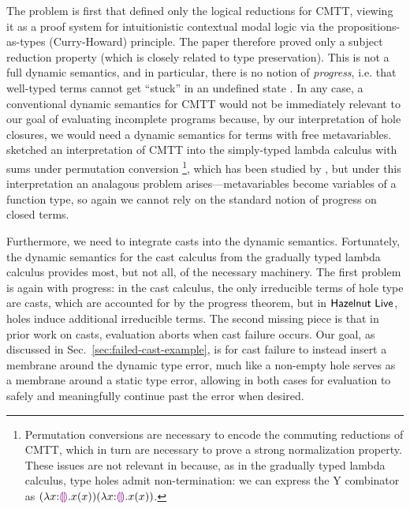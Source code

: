 The problem is first that \citet{Nanevski2008} defined only the logical reductions for CMTT, viewing it as a proof system for intuitionistic contextual modal logic via the propositions-as-types (Curry-Howard) principle. 
The paper therefore proved only a subject reduction property (which is closely related to type preservation). 
This is not a full dynamic semantics, and in particular, there is no notion of \emph{progress}, i.e. that well-typed terms cannot get ``stuck'' in an undefined state \cite{wright94:_type_soundness}. 
In any case, a conventional dynamic semantics for CMTT would not be immediately relevant to our goal of evaluating incomplete programs because, by our interpretation of hole closures, we would need a dynamic semantics for terms with free metavariables. 
\citet{Nanevski2008} sketched an interpretation of CMTT into the simply-typed lambda calculus with sums under permutation conversion%
\footnote{Permutation conversions are necessary to encode the commuting reductions of CMTT, which in turn are necessary to prove a strong normalization property. These issues are not relevant in \HazelnutLive because, as in the gradually typed lambda calculus, type holes admit non-termination: we can express the Y combinator as $(\lambda x{:}\textcolor{violet}{\llparenthesis}\textcolor{violet}{\rrparenthesis}.x(x)) (\lambda x{:}\textcolor{violet}{\llparenthesis}\textcolor{violet}{\rrparenthesis}.x(x))$.}, 
which has been studied by \citet{DBLP:journals/iandc/Groote02}, 
but under this interpretation an analagous problem arises---metavariables become variables of a function type, so again we cannot rely on the standard notion of progress on closed terms.%

Furthermore, we need to integrate casts into the dynamic semantics. 
Fortunately, the dynamic semantics for the cast calculus from the gradually typed lambda calculus provides most, but not all, of the necessary machinery. 
The first problem is again with progress: in the cast calculus, the only irreducible terms of hole type are casts, which are accounted for by the progress theorem, but in $\textsf{Hazelnut Live}$, holes induce additional irreducible terms. 
The second missing piece is that in prior work on casts, evaluation aborts when cast failure occurs. 
Our goal, as discussed in Sec.~\ref{sec:failed-cast-example}, is for cast failure to instead insert a membrane around the dynamic type error, 
much like a non-empty hole serves as a membrane around a static type error, 
allowing in both cases for evaluation to safely and meaningfully continue past the error when desired.
